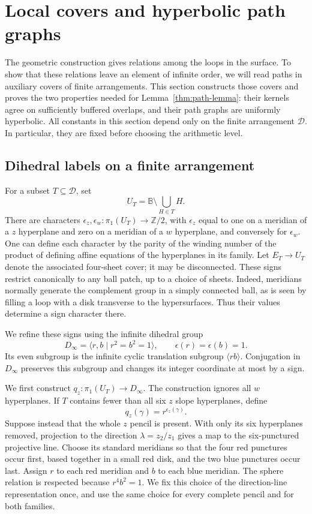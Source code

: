 \documentclass[11pt,reqno]{amsart}
\numberwithin{equation}{section}
\theoremstyle{definition}
\theoremstyle{remark}
\begin{document}
\section{Local covers and hyperbolic path graphs}\label{sec:models}

The geometric construction gives relations among the loops in the
surface.  To show that these relations leave an element of infinite
order, we will read paths in auxiliary covers of finite arrangements.
This section constructs those covers and proves the two properties
needed for Lemma~\ref{thm:path-lemma}: their kernels agree on sufficiently
buffered overlaps, and their path graphs are uniformly hyperbolic.
All constants in this section depend only on the finite arrangement
$\mathcal D$.  In particular, they are fixed before choosing the arithmetic
level.

\subsection{Dihedral labels on a finite arrangement}

For a subset $T\subseteq\mathcal D$, set
\[
 U_T=\mathbb B\setminus\bigcup_{H\in T}H.
\]
There are characters $\epsilon_z,\epsilon_w:\pi_1(U_T)\to\mathbb Z/2$,
with $\epsilon_z$ equal to one on a meridian of a $z$ hyperplane and
zero on a meridian of a $w$ hyperplane, and conversely for
$\epsilon_w$.  One can define each character by the parity of the
winding number of the product of defining affine equations of the
hyperplanes in its family.  Let $E_T\to U_T$ denote the associated
four-sheet cover; it may be disconnected.  These signs restrict
canonically to any ball patch, up to a choice of sheets.  Indeed,
meridians normally generate the complement group in a simply connected
ball, as is seen by filling a loop with a disk transverse to the
hypersurfaces.  Thus their values determine a sign character there.

We refine these signs using the infinite dihedral group
\[
 D_\infty=\langle r,b\mid r^2=b^2=1\rangle,
 \qquad \epsilon(r)=\epsilon(b)=1.
\]
Its even subgroup is the infinite cyclic translation subgroup
$\langle rb\rangle$.  Conjugation in $D_\infty$ preserves this subgroup
and changes its integer coordinate at most by a sign.

We first construct $q_z:\pi_1(U_T)\to D_\infty$.  The construction
ignores all $w$ hyperplanes.  If $T$ contains fewer than all six $z$
slope hyperplanes, define
\[
 q_z(\gamma)=r^{\epsilon_z(\gamma)}.
\]
Suppose instead that the whole $z$ pencil is present.  With only its
six hyperplanes removed, projection to the direction
$\lambda=z_2/z_1$ gives a map to the six-punctured projective line.
Choose its standard meridians so that the four red punctures occur
first, based together in a small red disk, and the two blue punctures
occur last.  Assign $r$ to each red meridian and $b$ to each blue
meridian.  The sphere relation is respected because $r^4b^2=1$.
We fix this choice of the direction-line representation once, and use
the same choice for every complete pencil and for both families.
\end{document}
